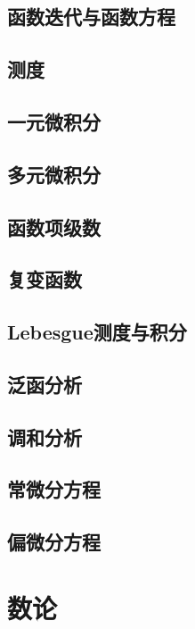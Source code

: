 \documentclass{book}
\begin{document}
\chapter{函数迭代与函数方程}

\chapter{测度}

\chapter{一元微积分}

\chapter{多元微积分}

\chapter{函数项级数}

\chapter{复变函数}


\chapter{Lebesgue测度与积分}

\chapter{泛函分析}


\chapter{调和分析}

\chapter{常微分方程}

\chapter{偏微分方程}

\part{数论}
\end{document}
